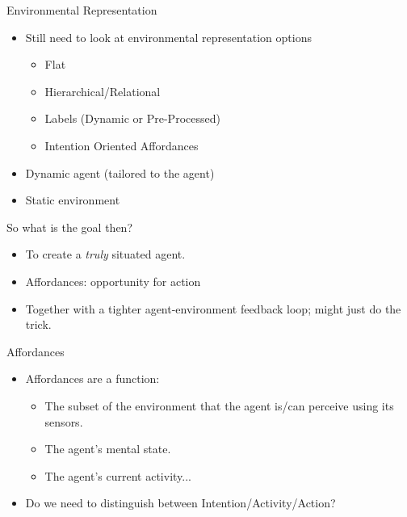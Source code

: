 \documentclass[aspectratio=1610,xcolor=dvipsnames,t]{beamer}
\begin{document}
\begin{frame}{Environmental Representation} 
    \begin{itemize} 
        \item Still need to look at environmental representation options
            \begin{itemize}
                \item Flat
                \item Hierarchical/Relational
                \item Labels (Dynamic or Pre-Processed)
                \item Intention Oriented Affordances
            \end{itemize} 
        \item Dynamic agent (tailored to the agent)
        \item Static environment
    \end{itemize} 
\end{frame} 

\begin{frame}{So what is the goal then?}
    \begin{itemize} 
        \item To create a \emph{truly} situated agent.
        \item Affordances: opportunity for action
        \item Together with a tighter agent-environment feedback loop; might
            just do the trick.
    \end{itemize} 
\end{frame} 

\begin{frame}{Affordances}
    \begin{itemize} 
        \item Affordances are a function:
            \begin{itemize}
                \item The subset of the environment that the agent is/can
                    perceive using its sensors.
                \item The agent's mental state.
                \item The agent's current activity...
            \end{itemize} 
        \item Do we need to distinguish between Intention/Activity/Action?
    \end{itemize} 
\end{frame} 
\end{document}
